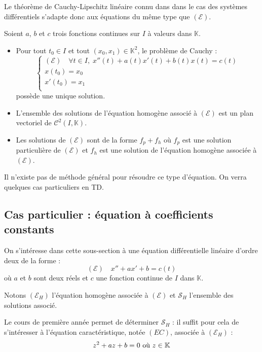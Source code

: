 \documentclass[french,11pt,twoside]{VcCours}
\begin{document}
Le théorème de Cauchy-Lipschitz linéaire connu dans dans le cas des systèmes différentiels s'adapte donc aux équations du même type que $(\mathcal{E})$.

\begin{Theoreme}{} Soient $a$, $b$ et $c$ trois fonctions continues sur $I$ à valeurs dans $\mathbb{K}$.

\begin{itemize}
\item Pour tout $t_0 \in I$ et tout $(x_0,x_1) \in \mathbb{K}^2$, le problème de Cauchy :
$$ \left\lbrace \begin{array}{l}
(\mathcal{E}) \quad \forall t \in I, \; x''(t)+a(t)x'(t)+b(t)x(t) = c(t)  \\
x(t_0)=x_0 \\
x'(t_0) = x_1 \\
\end{array}\right.$$
possède une unique solution.
\item L'ensemble des solutions de l'équation homogène associé à $(\mathcal{E})$ est un plan vectoriel de $\mathcal{C}^2(I, \mathbb{K})$.
\item Les solutions de $(\mathcal{E})$ sont de la forme $f_p + f_h$ où $f_p$ est une solution particulière de $(\mathcal{E})$ et $f_h$ est une solution de l'équation homogène associée à $(\mathcal{E})$.
\end{itemize}
\end{Theoreme}

\begin{Remarque}{} Il n'existe pas de méthode général pour résoudre ce type d'équation. On verra quelques cas particuliers en TD.
\end{Remarque}

\subsection{Cas particulier : équation à coefficients constants}

On s'intéresse dans cette sous-section à une équation différentielle linéaire d'ordre deux de la forme :
$$ (\mathcal{E}) \quad x''+ax'+b=c(t)$$
où $a$ et $b$ sont deux réels et $c$ une fonction continue de $I$ dans $\mathbb{K}$.

\medskip

Notons $(\mathcal{E}_H)$ l'équation homogène associée à $(\mathcal{E})$ et $\mathcal{S}_H$ l'ensemble des solutions associé.

\medskip

Le cours de première année permet de déterminer $\mathcal{S}_H$ : il suffit pour cela de s'intéresser à l'équation caractéristique, notée $(EC)$, associée à $(\mathcal{E}_H)$ :
$$ z^2+az+b=0 \hbox{ où } z \in \mathbb{K}$$
\end{document}
